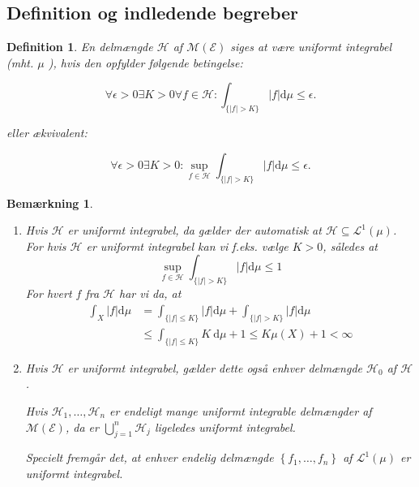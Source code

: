 \documentclass{article}
\newcommand{\1}{\mathbbm{1}}
\theoremstyle{boxed}
\newtheorem{definition}[theorem]{Definition}
\newtheorem{remark}[theorem]{Bemærkning}
\begin{document}
\subsection{Definition og indledende begreber}
\begin{theorem-box}
    \begin{definition}
        En delmængde $\mathcal{H}$ af $\mathcal{M}(\mathcal{E})$ siges at være uniformt integrabel (mht. $\mu$ ), hvis den opfylder følgende betingelse:

$$
\forall \epsilon>0 \exists K>0 \forall f \in \mathcal{H}: \int_{\{|f|>K\}}|f| \mathrm{d} \mu \leq \epsilon .
$$

eller ækvivalent:

$$
\forall \epsilon>0 \exists K>0: \sup _{f \in \mathcal{H}} \int_{\{|f|>K\}}|f| \mathrm{d} \mu \leq \epsilon .
$$

    \end{definition}
\end{theorem-box}
\begin{remark}
    \begin{enumerate}
        \item[\textnormal{(i)}] Hvis $\mathcal{H}$ er uniformt integrabel, da gælder der automatisk at $\mathcal{H} \subseteq \mathcal{L}^1(\mu)$.
        For hvis $\mathcal{H}$ er uniformt integrabel kan vi f.eks. vælge $K>0$, således at
        $$
        \sup _{f \in \mathcal{H}} \int_{\{|f|>K\}}|f| \mathrm{d} \mu \leq 1
        $$
        For hvert $f$ fra $\mathcal{H}$ har vi da, at
        $$
        \begin{aligned}
        \int_X|f| \mathrm{d} \mu & =\int_{\{|f| \leq K\}}|f| \mathrm{d} \mu+\int_{\{|f|>K\}}|f| \mathrm{d} \mu \\
        & \leq \int_{\{|f| \leq K\}} K \mathrm{~d} \mu+1 \leq K \mu(X)+1<\infty
        \end{aligned}
        $$
        \item[\textnormal{(ii)}] Hvis $\mathcal{H}$ er uniformt integrabel, gælder dette også enhver delmængde $\mathcal{H}_0$ af $\mathcal{H}$.

        Hvis $\mathcal{H}_1, \ldots, \mathcal{H}_n$ er endeligt mange uniformt integrable delmængder af $\mathcal{M}(\mathcal{E})$, da er $\bigcup_{j=1}^n \mathcal{H}_j$ ligeledes uniformt integrabel.
        
        Specielt fremgår det, at enhver endelig delmængde $\left\{f_1, \ldots, f_n\right\}$ af $\mathcal{L}^1(\mu)$ er uniformt integrabel.
    \end{enumerate}
\end{remark}
\end{document}
